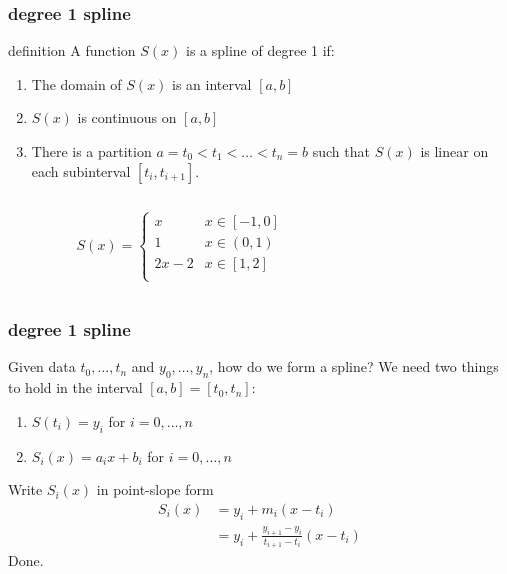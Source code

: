 \documentclass[10pt]{beamer}
\begin{document}
\begin{frame}
\frametitle{degree 1 spline}
\begin{block}{definition}
A function $S(x)$ is a spline of degree 1 if:
\begin{enumerate}
  \item The domain of $S(x)$ is an interval $[a,b]$
  \item $S(x)$ is continuous on $[a,b]$
  \item There is a partition $a=t_0<t_1<\dots<t_n=b$ such that $S(x)$ is
linear on each subinterval $[t_i,t_{i+1}]$.
\end{enumerate}
\end{block}
\begin{columns}
\begin{column}{0.45\textwidth}
\begin{example}
\begin{equation*}
  S(x) = \begin{cases}
  x & x \in [-1,0]\\
  1 & x \in (0,1)\\
  2x-2 & x \in [1,2]\\
\end{cases}
\end{equation*}
\end{example}
\end{column}
\begin{column}{0.45\textwidth}
\begin{center}
\end{center}
\end{column}
\end{columns}
\end{frame}
\begin{frame}
\frametitle{degree 1 spline}
Given data $t_0,\dots,t_n$ and $y_0,\dots,y_n$, how do we form a spline?
\bigskip
We need two things to hold in the interval $[a,b]=[t_0,t_n]$:
\begin{enumerate}
  \item $S(t_i) = y_i$ for $i=0,\dots,n$
  \item $S_i(x) = a_ix +b_i$ for $i=0,\dots,n$
\end{enumerate}
Write $S_i(x)$ in point-slope form
\begin{align*}
  S_i(x) & = y_i + m_i(x-t_i)\\
         & = y_i + \frac{y_{i+1}-y_i}{t_{i+1}-t_i}(x-t_i)
\end{align*}
Done.
\end{frame}
\end{document}
